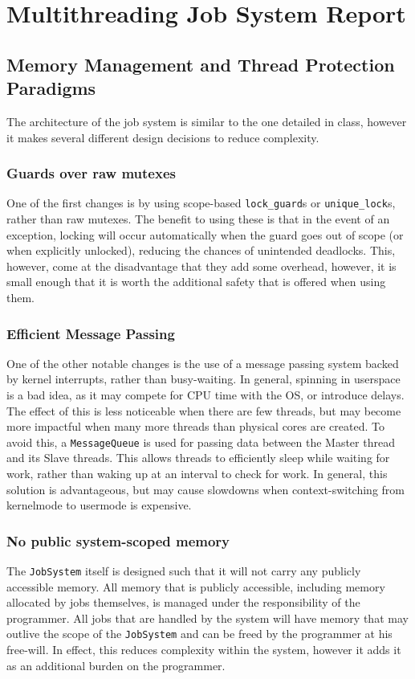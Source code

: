 \documentclass{article}
\begin{document}
\section*{Multithreading Job System Report}
	\subsection{Memory Management and Thread Protection Paradigms}
	The architecture of the job system is similar to the one detailed in class, however it makes several different design decisions to reduce complexity.
		\subsubsection{Guards over raw mutexes}
		One of the first changes is by using scope-based \texttt{lock\_guard}s or \texttt{unique\_lock}s, rather than raw mutexes. The benefit to using these is that in the event of an exception, locking will occur automatically when the guard goes out of scope (or when explicitly unlocked), reducing the chances of unintended deadlocks. This, however, come at the disadvantage that they add some overhead, however, it is small enough that it is worth the additional safety that is offered when using them.
		\subsubsection{Efficient Message Passing}
			One of the other notable changes is the use of a message passing system backed by kernel interrupts, rather than busy-waiting. In general, spinning in userspace is a bad idea, as it may compete for CPU time with the OS, or introduce delays. The effect of this is less noticeable when there are few threads, but may become more impactful when many more threads than physical cores are created. To avoid this, a \texttt{MessageQueue} is used for passing data between the Master thread and its Slave threads. This allows threads to efficiently sleep while waiting for work, rather than waking up at an interval to check for work. In general, this solution is advantageous, but may cause slowdowns when context-switching from kernelmode to usermode is expensive.
		\subsubsection{No public system-scoped memory}
			The \texttt{JobSystem} itself is designed such that it will not carry any publicly accessible memory. All memory that is publicly accessible, including memory allocated by jobs themselves, is managed under the responsibility of the programmer. All jobs that are handled by the system will have memory that may outlive the scope of the \texttt{JobSystem} and can be freed by the programmer at his free-will. In effect, this reduces complexity within the system, however it adds it as an additional burden on the programmer.
\end{document}
